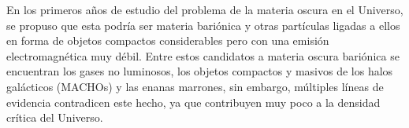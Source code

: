 
En los primeros a\~nos de estudio del problema de la materia oscura en el Universo, se propuso que esta podría ser materia bariónica y otras partículas ligadas a ellos en forma de objetos compactos considerables pero con una emisión electromagnética muy débil. Entre estos candidatos a materia oscura bariónica se encuentran los gases no luminosos, los objetos compactos y masivos de los halos galácticos (MACHOs) y las enanas marrones, sin embargo, múltiples líneas de evidencia contradicen este hecho, ya que contribuyen muy poco a la densidad crítica del Universo.


